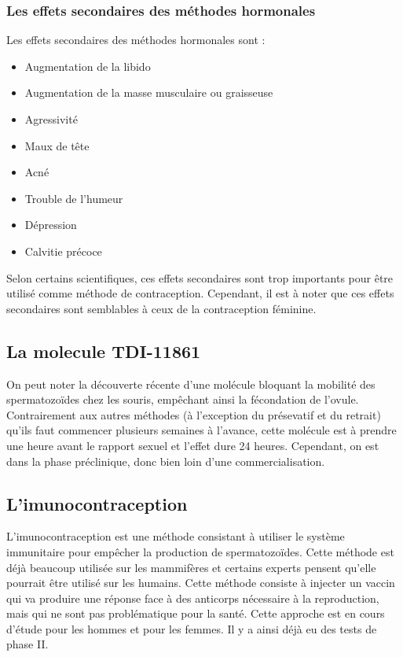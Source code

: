 \documentclass[12pt,a4paper]{report}
\begin{document}
\subsubsection{Les effets secondaires des méthodes hormonales}

Les effets secondaires des méthodes hormonales sont :
\begin{itemize}
    \item Augmentation de la libido
    \item Augmentation de la masse musculaire ou graisseuse
    \item Agressivité
    \item Maux de tête
    \item Acné
    \item Trouble de l'humeur
    \item Dépression
    \item Calvitie précoce \cites{guillaumedaudinContraceptesEnqueteDernier2022}{anne-sophiedelcourHommeSousPilule}{ContraceptionHormonaleMasculine2016}
\end{itemize}

Selon certains scientifiques, ces effets secondaires sont trop importants pour être utilisé comme méthode de contraception. Cependant, il est à noter que ces effets secondaires sont semblables à ceux de la contraception féminine. \cite{ContraceptionHormonaleMasculine2016}

\subsection{La molecule TDI-11861}

On peut noter la découverte récente d'une molécule bloquant la mobilité des spermatozoïdes chez les souris, empêchant ainsi la fécondation de l'ovule.
Contrairement aux autres méthodes (à l'exception du présevatif et du retrait) qu'ils faut commencer plusieurs semaines à l'avance, cette molécule est à prendre une heure avant le rapport sexuel et l'effet dure 24 heures. \cite{balbachOndemandMaleContraception2023}
Cependant, on est dans la phase préclinique, donc bien loin d'une commercialisation. \cite{DeveloppementMedicamentInserm}

\subsection{L'imunocontraception}

L'imunocontraception est une méthode consistant à utiliser le système immunitaire pour empêcher la production de spermatozoïdes.
Cette méthode est déjà beaucoup utilisée sur les mammifères et certains experts pensent qu'elle pourrait être utilisé sur les humains. \cite{ImmunocontraceptionWikipedia}
Cette méthode consiste à injecter un vaccin qui va produire une réponse face à des anticorps nécessaire à la reproduction, mais qui ne sont pas problématique pour la santé.
Cette approche est en cours d'étude pour les hommes et pour les femmes. Il y a ainsi déjà eu des tests de phase II. \cite{mclaughlinThereRoleImmunocontraception2011}
\end{document}
